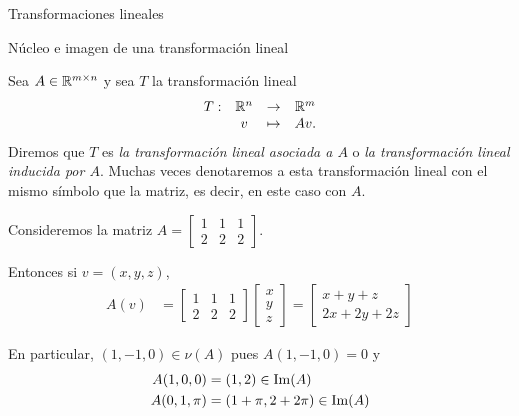 \begin{chapter}{Transformaciones lineales}
\begin{section}{N\'ucleo e imagen de una transformaci\'on lineal}
\begin{definicion}
    Sea $A\in\mathbb R^{m\times n}$ y sea $T$ la transformación lineal 
    \begin{align*}
        \begin{array}{rccc}
            T : &\mathbb R^n &\to &\mathbb R^m \\
                &v &\mapsto &Av.
        \end{array}
        \end{align*}
        Diremos que $T$  es \textit{la transformación lineal asociada a $A$} o  \textit{la transformación lineal inducida por $A$}. Muchas veces denotaremos a esta transformación lineal con el mismo símbolo que la matriz, es decir, en este caso con $A$.  
\end{definicion}



\begin{ejemplo*}
    Consideremos la matriz $A=\begin{bmatrix}   1&1&1\\   2&2&2 \end{bmatrix}$.
    

    
    Entonces si $v =(x,y,z)$, 
    \begin{align*}
    A(v) &= \begin{bmatrix} 1&1&1\\2&2&2 \end{bmatrix} \begin{bmatrix}  x\\y\\z \end{bmatrix}
    = \begin{bmatrix}  x+y+z\\2x+2y+2z \end{bmatrix}           
    \end{align*}
    

    
    En particular,
    $(1,-1,0)\in\nu(A)$ pues $A(1,-1,0)=0$ y
    \begin{align*}
    A(1,0,0)&=(1,2)\in\operatorname{Im}(A)\\
    A(0,1,\pi)&=(1+\pi,2+2\pi)\in\operatorname{Im}(A)
    \end{align*}
\end{ejemplo*}



\end{section}
\end{chapter}
